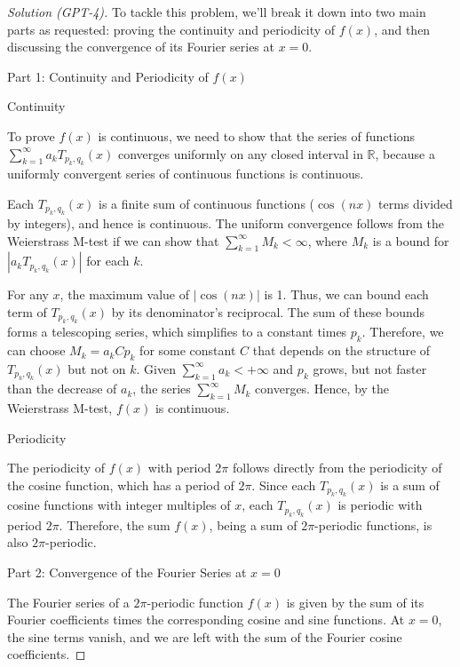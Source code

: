\documentclass[11pt]{article}
\numberwithin{equation}{section}
\begin{document}
\begin{proof}[Solution (GPT-4)]
 To tackle this problem, we'll break it down into two main parts as requested: proving the continuity and periodicity of \(f(x)\), and then discussing the convergence of its Fourier series at \(x = 0\).
  
  Part 1: Continuity and Periodicity of \(f(x)\)
  
  Continuity
  
  To prove \(f(x)\) is continuous, we need to show that the series of functions \(\sum_{k=1}^{\infty} a_k T_{p_k, q_k}(x)\) converges uniformly on any closed interval in \(\mathbb{R}\), because a uniformly convergent series of continuous functions is continuous.
  
  Each \(T_{p_k, q_k}(x)\) is a finite sum of continuous functions (\(\cos(nx)\) terms divided by integers), and hence is continuous. The uniform convergence follows from the Weierstrass M-test if we can show that \(\sum_{k=1}^{\infty} M_k < \infty\), where \(M_k\) is a bound for \(|a_k T_{p_k, q_k}(x)|\) for each \(k\).
  
  For any \(x\), the maximum value of \(|\cos(nx)|\) is 1. Thus, we can bound each term of \(T_{p_k, q_k}(x)\) by its denominator's reciprocal. The sum of these bounds forms a telescoping series, which simplifies to a constant times \(p_k\). Therefore, we can choose \(M_k = a_k C p_k\) for some constant \(C\) that depends on the structure of \(T_{p_k, q_k}(x)\) but not on \(k\). Given \(\sum_{k=1}^{\infty} a_k < +\infty\) and \(p_k\) grows, but not faster than the decrease of \(a_k\), the series \(\sum_{k=1}^{\infty} M_k\) converges. Hence, by the Weierstrass M-test, \(f(x)\) is continuous.
  
 Periodicity
  
  The periodicity of \(f(x)\) with period \(2\pi\) follows directly from the periodicity of the cosine function, which has a period of \(2\pi\). Since each \(T_{p_k, q_k}(x)\) is a sum of cosine functions with integer multiples of \(x\), each \(T_{p_k, q_k}(x)\) is periodic with period \(2\pi\). Therefore, the sum \(f(x)\), being a sum of \(2\pi\)-periodic functions, is also \(2\pi\)-periodic.
  
  Part 2: Convergence of the Fourier Series at \(x = 0\)
  
  The Fourier series of a \(2\pi\)-periodic function \(f(x)\) is given by the sum of its Fourier coefficients times the corresponding cosine and sine functions. At \(x = 0\), the sine terms vanish, and we are left with the sum of the Fourier cosine coefficients.
  

\end{proof}
\end{document}
